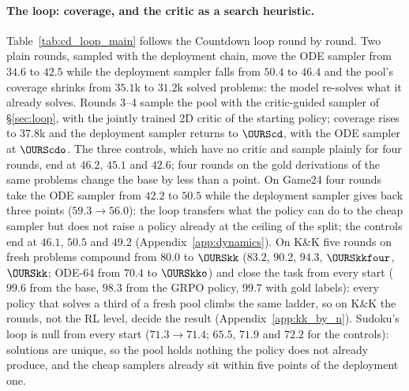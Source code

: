 \paragraph{The loop: coverage, and the critic as a search heuristic.}
Table~\ref{tab:cd_loop_main} follows the Countdown loop round by round. Two plain rounds, sampled with the deployment chain, move the ODE sampler from $34.6$ to $42.5$ while the deployment sampler falls from $50.4$ to $46.4$ and the pool's coverage shrinks from $35.1$k to $31.2$k solved problems: the model re-solves what it already solves. Rounds 3--4 sample the pool with the critic-guided sampler of \S\ref{sec:loop}, with the jointly trained 2D critic of the starting policy; coverage rises to $37.8$k and the deployment sampler returns to $\OURScd$, with the ODE sampler at $\OURScdo$. The three controls, which have no critic and sample plainly for four rounds, end at $46.2$, $45.1$ and $42.6$; four rounds on the gold derivations of the same problems change the base by less than a point. On Game24 four rounds take the ODE sampler from $42.2$ to $50.5$ while the deployment sampler gives back three points ($59.3\to56.0$): the loop transfers what the policy can do to the cheap sampler but does not raise a policy already at the ceiling of the split; the controls end at $46.1$, $50.5$ and $49.2$ (Appendix~\ref{app:dynamics}). On K\&K five rounds on fresh problems compound from $80.0$ to $\OURSkk$ ($83.2$, $90.2$, $94.3$, $\OURSkkfour$, $\OURSkk$; ODE-64 from $70.4$ to $\OURSkko$) and close the task from every start ($99.6$ from the base, $98.3$ from the GRPO policy, $99.7$ with gold labels): every policy that solves a third of a fresh pool climbs the same ladder, so on K\&K the rounds, not the RL level, decide the result (Appendix~\ref{app:kk_by_n}). Sudoku's loop is null from every start ($71.3\to71.4$; $65.5$, $71.9$ and $72.2$ for the controls): solutions are unique, so the pool holds nothing the policy does not already produce, and the cheap samplers already sit within five points of the deployment one.

